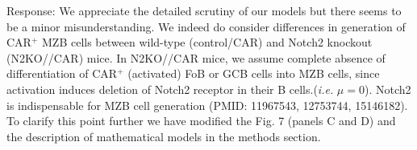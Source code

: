 \documentclass[11pt]{article}
\newcommand{\blue}[1]{{\color{blue}{#1}}}
\begin{document}
Response: We appreciate the detailed scrutiny of our models but there seems to be a minor misunderstanding.
We indeed do consider differences in generation of CAR$^{+}$ MZB cells between wild-type (control/CAR) and Notch2 knockout (N2KO//CAR) mice.
In N2KO//CAR mice, we assume complete absence of differentiation of CAR$^{+}$ (activated) FoB  or GCB cells into MZB cells, since activation induces deletion of Notch2 receptor in their B cells.(\textit{i.e.} $\mu=0$).
Notch2 is indispensable for MZB cell generation (PMID: 11967543, 12753744, 15146182).
To clarify this point further we have modified the Fig. 7 (panels C and D) and the description of mathematical models in the methods section.

\blue{Depending on the tone that you are going for you may either keep or remove this: \\
We believe we are known in the field for taking a great care in developing approaches that integrate theory and biology closely; and would like to argue that our model-design here too is well tethered to the underlying biology of the experimental system and suited for the questions we are asking. 
}
\end{document}
